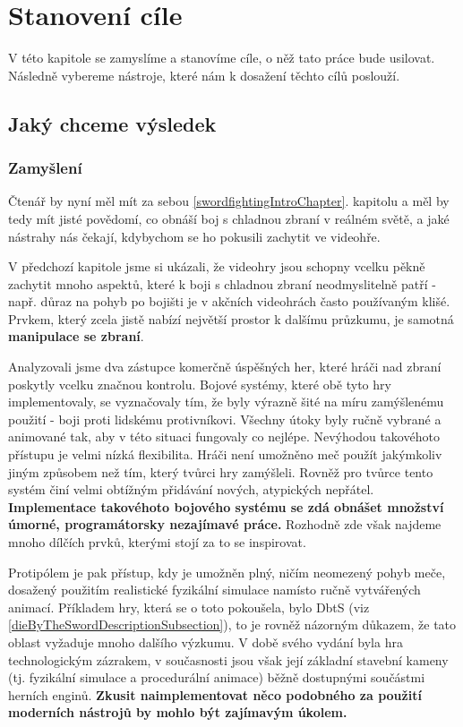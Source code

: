 \chapter{Stanovení cíle} \label{goalSettingChapter}

V této kapitole se zamyslíme a stanovíme cíle, o něž tato práce bude usilovat. Následně vybereme nástroje, které nám k dosažení těchto cílů poslouží.  


\section{Jaký chceme výsledek}

\subsection{Zamyšlení}
Čtenář by nyní měl mít za sebou \ref{swordfightingIntroChapter}. kapitolu a měl by tedy mít jisté povědomí, co obnáší boj s chladnou zbraní v reálném světě, a jaké nástrahy nás čekají, kdybychom se ho pokusili zachytit ve videohře. 

V předchozí kapitole jsme si ukázali, že videohry jsou schopny vcelku pěkně zachytit mnoho aspektů, které k boji s chladnou zbraní neodmyslitelně patří - např. důraz na pohyb po bojišti je v akčních videohrách často používaným klišé. Prvkem, který zcela jistě nabízí největší prostor k dalšímu průzkumu, je samotná \textbf{manipulace se zbraní}.

Analyzovali jsme dva zástupce komerčně úspěšných her, které hráči nad zbraní poskytly vcelku značnou kontrolu. Bojové systémy, které obě tyto hry implementovaly, se vyznačovaly tím, že byly výrazně šité na míru zamýšlenému použití - boji proti lidskému protivníkovi. Všechny útoky byly ručně vybrané a animované tak, aby v této situaci fungovaly co nejlépe. Nevýhodou takovéhoto přístupu je velmi nízká flexibilita. Hráči není umožněno meč použít jakýmkoliv jiným způsobem než tím, který tvůrci hry zamýšleli. Rovněž pro tvůrce tento systém činí velmi obtížným přidávání nových, atypických nepřátel. \textbf{Implementace takovéhoto bojového systému se zdá obnášet množství úmorné, programátorsky nezajímavé práce.} Rozhodně zde však najdeme mnoho dílčích prvků, kterými stojí za to se inspirovat.

Protipólem je pak přístup, kdy je umožněn plný, ničím neomezený pohyb meče, dosažený použitím realistické fyzikální simulace namísto ručně vytvářených animací. Příkladem hry, která se o toto pokoušela, bylo \acl{DbtS} (viz \ref{dieByTheSwordDescriptionSubsection}), to je rovněž názorným důkazem, že tato oblast vyžaduje mnoho dalšího výzkumu. V době svého vydání byla hra technologickým zázrakem, v současnosti jsou však její základní stavební kameny (tj. fyzikální simulace a procedurální animace) běžně dostupnými součástmi herních enginů. \textbf{Zkusit naimplementovat něco podobného za použití moderních nástrojů by mohlo být zajímavým úkolem.}


